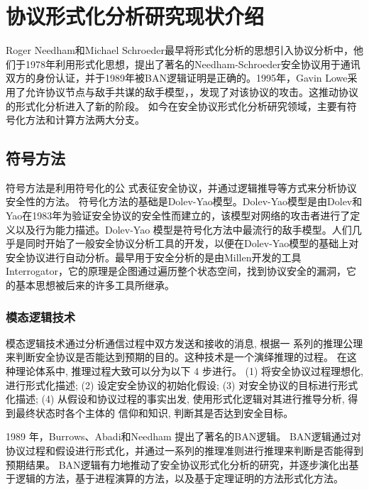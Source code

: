 

\section{协议形式化分析研究现状介绍}
Roger Needham和Michael Schroeder最早将形式化分析的思想引入协议分析中，他们于1978年利用形式化思想，提出了著名的Needham-Schroeder安全协议用于通讯双方的身份认证，并于1989年被BAN逻辑\cite{Burrows1990}证明是正确的。1995年，Gavin Lowe采用了允许协议节点与敌手共谋的敌手模型，，发现了对该协议的攻击\cite{lowe1996breaking}。这推动协议的形式化分析进入了新的阶段。  如今在安全协议形式化分析研究领域，主要有符号化方法和计算方法两大分支。

\subsection{符号方法}
符号方法是利用符号化的公
式表征安全协议，并通过逻辑推导等方式来分析协议安全性的方法。 
符号化方法的基础是Dolev-Yao模型\cite{Dolev1982}。Dolev-Yao模型是由Dolev和Yao在1983年为验证安全协议的安全性而建立的，该模型对网络的攻击者进行了定义以及行为能力描述。Dolev-Yao 模型是符号化方法中最流行的敌手模型。人们几乎是同时开始了一般安全协议分析工具的开发，以便在Dolev-Yao模型的基础上对安全协议进行自动分析。最早用于安全分析的是由Millen开发的工具Interrogator\cite{1702206}，它的原理是企图通过遍历整个状态空间，找到协议安全的漏洞，它的基本思想被后来的许多工具所继承。



\subsubsection{模态逻辑技术}
模态逻辑技术通过分析通信过程中双方发送和接收的消息, 根据一
系列的推理公理来判断安全协议是否能达到预期的目的。这种技术是一个演绎推理的过程。 在这种理论体系中, 推理过程大致可以分为以下
4 步进行。
(1) 将安全协议过程理想化, 进行形式化描述;
(2) 设定安全协议的初始化假设;
(3) 对安全协议的目标进行形式化描述;
(4) 从假设和协议过程的事实出发, 使用形式化逻辑对其进行推导分析, 得到最终状态时各个主体的
信仰和知识, 判断其是否达到安全目标。

 1989 年，Burrows、Abadi和Needham 提出了著名的BAN逻辑\cite{Burrows1990}。 BAN逻辑通过对协议过程和假设进行形式化，并通过一系列的推理准则进行推理来判断是否能得到预期结果。 BAN逻辑有力地推动了安全协议形式化分析的研究，并逐步演化出基于逻辑的方法\cite{gong1990reasoning,Abadi1991,Kunnemann}，基于进程演算的方法\cite{Jeffrey2006,Abadi1999,gordon2001authenticity,gordon2002types}，以及基于定理证明的方法形式化方法\cite{Paulson1997a,Paulson1997,Cortier2017}。


